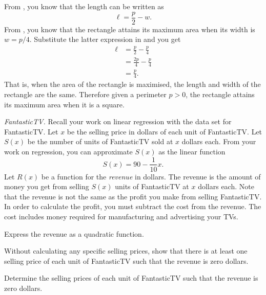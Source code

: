 \documentclass[a4paper,oneside,12pt]{article}
\begin{document}
\begin{problem}
{\begin{solution}
From , you know that the length can
be written as
\begin{equation}
\label{eqn:rectangle_length_as_width_and_perimeter}
\ell
=
\frac{p}{2} - w.
\end{equation}
From , you know that the
rectangle attains its maximum area when its width is $w = p / 4$.
Substitute the latter expression in
 and you get
\begin{align*}
\ell
&=
\frac{p}{2} - \frac{p}{4} \\[4pt]
&=
\frac{2p}{4} - \frac{p}{4} \\[4pt]
&=
\frac{p}{4}.
\end{align*}
That is, when the area of the rectangle is maximised, the length and
width of the rectangle are the same.  Therefore given a perimeter
$p > 0$, the rectangle attains its maximum area when it is a square.
\end{solution}
}{}

\item\emph{FantasticTV.}
  Recall your work on linear regression with the data set for
  FantasticTV.  Let $x$ be the selling price in dollars of each unit
  of FantasticTV.  Let $S(x)$ be the number of units of FantasticTV
  sold at $x$ dollars each.  From your work on regression, you can
  approximate $S(x)$ as the linear function
  \[
  S(x)
  =
  90 - \frac{1}{10}x.
  \]
  Let $R(x)$ be a function for the \emph{revenue} in dollars.  The
  revenue is the amount of money you get from selling $S(x)$ units of
  FantasticTV at $x$ dollars each.  Note that the revenue is not the
  same as the profit you make from selling FantasticTV.  In order to
  calculate the profit, you must subtract the cost from the revenue.
  The cost includes money required for manufacturing and advertising
  your TVs.
  \begin{packedenum}
  \item\label{subprob:FantasticTV_total_revenue}
    Express the revenue as a quadratic function.

  \item\label{subprob:FantasticTV_zero_revenue_exist}
    Without calculating any specific selling prices, show that there
    is at least one selling price of each unit of FantasticTV such
    that the revenue is zero dollars.

  \item\label{subprob:FantasticTV_zero_revenue}
    Determine the selling prices of each unit of FantasticTV such that
    the revenue is zero dollars.


\end{packedenum}
\end{problem}
\end{document}
